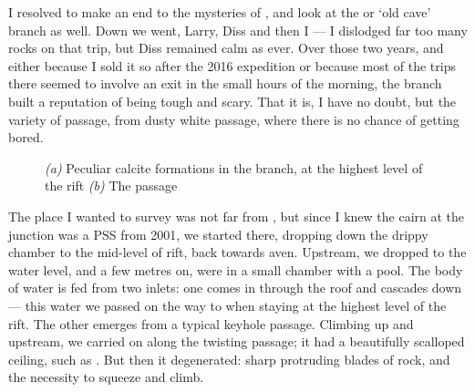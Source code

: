 	I resolved to make an end to the mysteries of , and look at the  or `old cave' branch as well. Down we went, Larry, Diss and then I --- I dislodged far too many rocks on that trip, but Diss remained calm as ever. Over those two years, and either because I sold it so after the 2016 expedition or because most of the trips there seemed to involve an  exit in the small hours of the morning, the  branch built a reputation of being tough and scary.  That it is, I have no doubt, but the variety of passage, from dusty white  passage,  where there is no chance of getting bored. 
    	
\begin{figure*}[t!]
	\checkoddpage \ifoddpage \forcerectofloat \else \forceversofloat \fi
	\centering
	\begin{subfigure}[t]{0.328\textwidth}
		\centering
		 \caption{}\label{povezava formation}
	\end{subfigure}
  	 \hfill
   	 \begin{subfigure}[t]{0.662\textwidth}
        		\centering
        		\caption{} \label{mary cafe tanguy}
        \end{subfigure}
	\caption{
	 	  \textit{(a)} Peculiar calcite formations in the \protect{} branch, at the highest level of the rift
   		 \textit{(b)} The \protect{} passage }
\end{figure*}
	


	The place I wanted to survey was not far from , but since I knew the cairn at the junction was a PSS from 2001, we started there, dropping down the drippy chamber to the mid-level of rift, back towards  aven. Upstream, we dropped to the water level, and a few metres on, were in a small chamber with a pool. The body of water is fed from two inlets: one comes in through the roof and cascades down --- this water we passed on the way to  when staying at the highest level of the rift. The other emerges from a typical keyhole passage. Climbing up and upstream, we carried on along the twisting passage; it had a beautifully scalloped ceiling, such as . But then it degenerated: sharp protruding blades of rock, and the necessity to squeeze and climb. 
	
